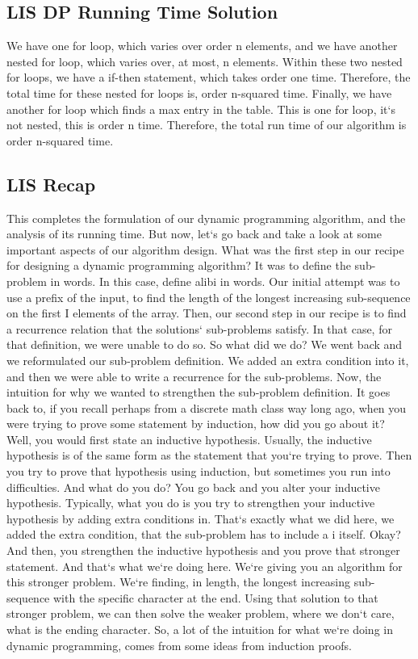 \subsection{LIS  DP Running Time Solution}
We have one for loop, which varies over order n elements, and we have another nested for loop, which varies over, at most, n elements.
Within these two nested for loops, we have a if-then statement, which takes order one time.
Therefore, the total time for these nested for loops is, order n-squared time.
Finally, we have another for loop which finds a max entry in the table.
This is one for loop, it`s not nested, this is order n time.
Therefore, the total run time of our algorithm is order n-squared time.

\subsection{LIS Recap}
This completes the formulation of our dynamic programming algorithm, and the analysis of its running time.
But now, let`s go back and take a look at some important aspects of our algorithm design.
What was the first step in our recipe for designing a dynamic programming algorithm? It was to define the sub-problem in words.
In this case, define alibi in words.
Our initial attempt was to use a prefix of the input, to find the length of the longest increasing sub-sequence on the first I elements of the array.
Then, our second step in our recipe is to find a recurrence relation that the solutions` sub-problems satisfy.
In that case, for that definition, we were unable to do so.
So what did we do? We went back and we reformulated our sub-problem definition.
We added an extra condition into it, and then we were able to write a recurrence for the sub-problems.
Now, the intuition for why we wanted to strengthen the sub-problem definition.
It goes back to, if you recall perhaps from a discrete math class way long ago, when you were trying to prove some statement by induction, how did you go about it? Well, you would first state an inductive hypothesis.
Usually, the inductive hypothesis is of the same form as the statement that you`re trying to prove.
Then you try to prove that hypothesis using induction, but sometimes you run into difficulties.
And what do you do? You go back and you alter your inductive hypothesis.
Typically, what you do is you try to strengthen your inductive hypothesis by adding extra conditions in.
That`s exactly what we did here, we added the extra condition, that the sub-problem has to include a i itself.
Okay? And then, you strengthen the inductive hypothesis and you prove that stronger statement.
And that`s what we`re doing here.
We`re giving you an algorithm for this stronger problem.
We`re finding, in length, the longest increasing sub-sequence with the specific character at the end.
Using that solution to that stronger problem, we can then solve the weaker problem, where we don`t care, what is the ending character.
So, a lot of the intuition for what we`re doing in dynamic programming, comes from some ideas from induction proofs.

